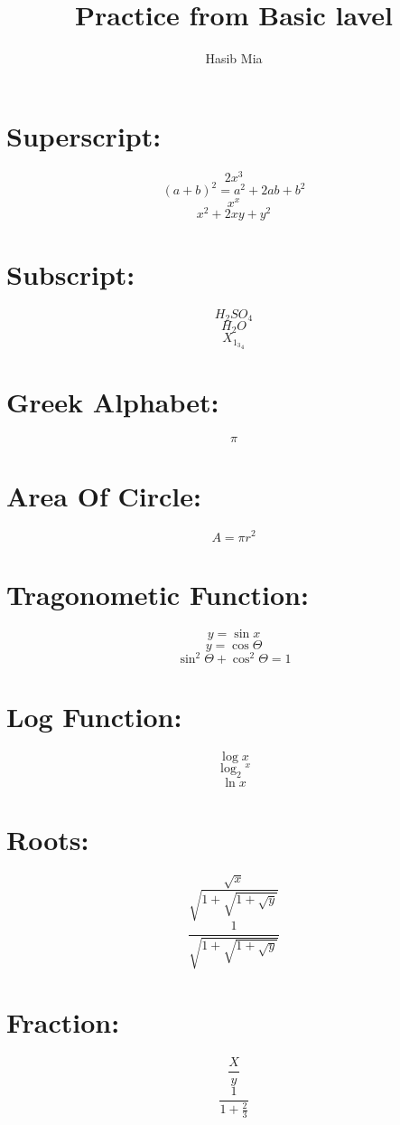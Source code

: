 \documentclass{article}
\author{Hasib Mia}
\title{Practice from Basic lavel}
\begin{document}
	\maketitle
	\section{Superscript:}
	$$2x^3$$
	$$(a+b)^2=a^2+2ab+b^2$$
	$$x^x$$
	$$x^2+2xy+y^2$$
	\section{Subscript:}
	$$H_2SO_4$$
	$$H_2O$$
	$$ X_{{1}{_3}_4}$$
	\section{Greek Alphabet:}
	$$ \pi$$
	\section{Area Of Circle:}
	$$A=\pi r^2$$
	\section{Tragonometic Function:}
	$$y=\sin x$$
	$$ y=\cos\Theta$$
	$$\sin^2\Theta+\cos^2\Theta=1$$
	\section{Log Function:}
	$$\log x$$
	$$\log_2{^x}$$
	$$\ln x$$
	\section{Roots:}
	$$\sqrt{x}$$
	$$\sqrt{1+\sqrt{1+\sqrt{y}}}$$
$$\frac{1}{\sqrt{1+\sqrt{1+\sqrt{y}}}}$$
	
	\section{Fraction:}
	$$\frac{X}{y}$$
	$$\frac{1}{1+\frac{2}{3}}$$
	
	
	
\end{document}
